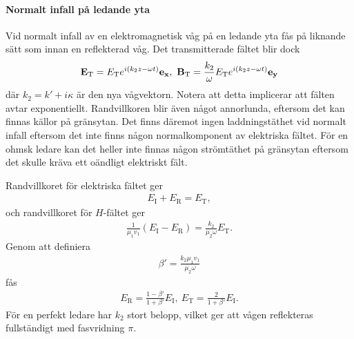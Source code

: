 \paragraph{Normalt infall på ledande yta}
Vid normalt infall av en elektromagnetisk våg på en ledande yta fås på liknande sätt som innan en reflekterad våg. Det transmitterade fältet blir dock
\begin{align*}
	\vb{E}_{\text{T}} = E_{\text{T}}e^{i(k_{2}z - \omega t)}\ub{x},\ \vb{B}_{\text{T}} = \frac{k_{2}}{\omega}E_{\text{T}}e^{i(k_{2}z - \omega t)}\ub{y}
\end{align*}
där $k_{2} = k' + i\kappa$ är den nya vågvektorn. Notera att detta implicerar att fälten avtar exponentiellt. Randvillkoren blir även något annorlunda, eftersom det kan finnas källor på gränsytan. Det finns däremot ingen laddningstäthet vid normalt infall eftersom det inte finns någon normalkomponent av elektriska fältet. För en ohmsk ledare kan det heller inte finnas någon strömtäthet på gränsytan eftersom det skulle kräva ett oändligt elektriskt fält.

Randvillkoret för elektriska fältet ger
\begin{align*}
	E_{\text{I}} + E_{\text{R}} = E_{\text{T}},
\end{align*}
och randvillkoret för $H$-fältet ger
\begin{align*}
	\frac{1}{\mu_{1}v_{1}}(E_{\text{I}} - E_{\text{R}}) = \frac{k_{2}}{\mu_{2}\omega}E_{\text{T}}.
\end{align*}
Genom att definiera
\begin{align*}
	\beta' = \frac{k_{2}\mu_{1}v_{1}}{\mu_{2}\omega}
\end{align*}
fås
\begin{align*}
	E_{\text{R}} = \frac{1 - \beta'}{1 + \beta'}E_{\text{I}},\ E_{\text{T}} = \frac{2}{1 + \beta'}E_{\text{I}}.
\end{align*}
För en perfekt ledare har $k_{2}$ stort belopp, vilket ger att vågen reflekteras fullständigt med fasvridning $\pi$.